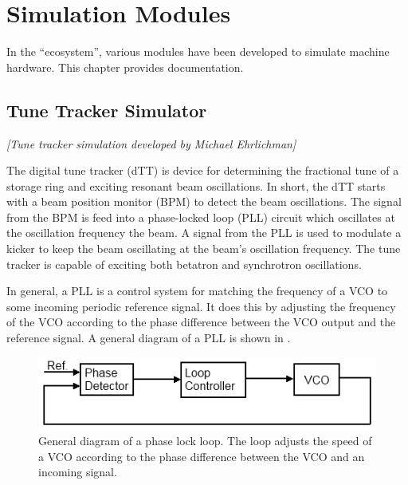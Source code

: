 \chapter{Simulation Modules}

In the \bmad ``ecosystem'', various modules have been developed to
simulate machine hardware. This chapter provides documentation.

\section{Tune Tracker Simulator}

\textit{\large [Tune tracker simulation developed by Michael Ehrlichman]}

The digital tune tracker (dTT) is device for determining the
fractional tune of a storage ring and exciting resonant beam
oscillations.  In short, the dTT starts with a beam position monitor
(BPM) to detect the beam oscillations. The signal from the BPM is feed
into a phase-locked loop (PLL) circuit which oscillates at the
oscillation frequency the beam. A signal from the PLL is used to
modulate a kicker to keep the beam oscillating at the beam's
oscillation frequency. The tune tracker is capable of exciting both
betatron and synchrotron oscillations.

In general, a PLL is a control system for matching the frequency of a
VCO to some incoming periodic reference signal.  It does this by
adjusting the frequency of the VCO according to the phase difference
between the VCO output and the reference signal.  A general diagram of
a PLL is shown in .

  \begin{figure}[bt]
  \centering
  \includegraphics{PLL.png}
  \caption[General diagram of a phase lock loop.]{
General diagram of a phase lock loop. The loop adjusts the speed of a
VCO according to the phase difference between the VCO and an incoming
signal.}
  \label{f:PLL}
  \end{figure}

